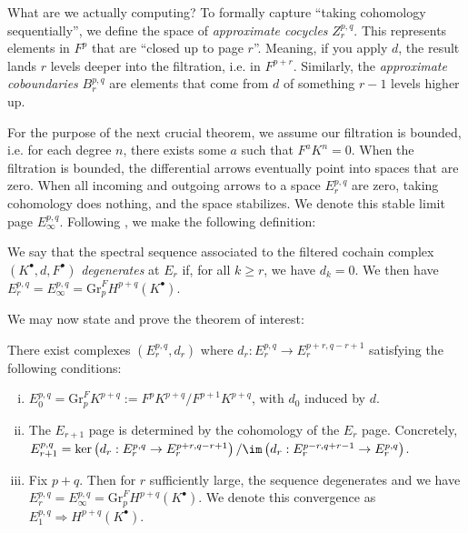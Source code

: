 \noindent What are we actually computing? To formally capture ``taking cohomology sequentially'', we define the space of \emph{approximate cocycles} $Z_r^{p,q}$. This represents elements in $F^p$ that are ``closed up to page $r$''. Meaning, if you apply $d$, the result lands $r$ levels deeper into the filtration, i.e. in $F^{p+r}$. Similarly, the \emph{approximate coboundaries} $B_r^{p,q}$ are elements that come from $d$ of something $r-1$ levels higher up.

\medskip

\noindent For the purpose of the next crucial theorem, we assume our filtration is bounded, i.e. for each degree $n$, there exists some $a$ such that $F^a K^n=0$. When the filtration is bounded, the differential arrows eventually point into spaces that are zero. When all incoming and outgoing arrows to a space $E_r^{p,q}$ are zero, taking cohomology does nothing, and the space stabilizes. We denote this stable limit page $E_\infty^{p,q}$. Following \cite[Definition 8.26]{VoisinI2002}, we make the following definition:

\begin{definition}
    We say that the spectral sequence associated to the filtered cochain complex $\left(K^\bullet, d, F^\bullet\right)$ \emph{degenerates} at $E_r$ if, for all $k\geq r$, we have $d_k=0$. We then have $E_r^{p,q} = E_\infty^{p,q} = \mathrm{Gr}_p^F H^{p+q}\left(K^\bullet\right)$.
\end{definition}

\noindent We may now state and prove the theorem of interest:

\begin{theorem}
    There exist complexes $\left(E_r^{p,q}, d_r\right)$ where $d_r:E_r^{p,q} \to E_r^{p+r,q-r+1}$ satisfying the following conditions:
    \begin{enumerate}[i.]
        \item $E_0^{p,q}=\mathrm{Gr}_p^F K^{p+q}:= F^pK^{p+q}/F^{p+1}K^{p+q}$, with $d_0$ induced by $d$.
        \item The $E_{r+1}$ page is determined by the cohomology of the $E_r$ page. Concretely, $E_{r+1}^{p,q} = \ker\left(d_r:E_r^{p,q}\to E_r^{p+r,q-r+1}\right)/\im \left(d_r:E_r^{p-r, q+r-1}\to E_r^{p,q}\right)$. 
        \item Fix $p+q$. Then for $r$ sufficiently large, the sequence degenerates and we have $E_r^{p,q} = E_\infty^{p,q} = \mathrm{Gr}_p^F H^{p+q}\left(K^\bullet\right)$. We denote this convergence as $E_1^{p,q} \Rightarrow H^{p+q}\left(K^\bullet\right)$.
    \end{enumerate}
\end{theorem}

